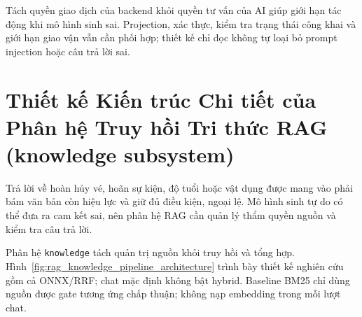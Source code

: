 Tách quyền giao dịch của backend khỏi quyền tư vấn của AI giúp giới hạn tác động khi mô hình sinh sai. Projection, xác thực, kiểm tra trạng thái công khai và giới hạn giao vận vẫn cần phối hợp; thiết kế chỉ đọc không tự loại bỏ prompt injection hoặc câu trả lời sai.

\section{Thiết kế Kiến trúc Chi tiết của Phân hệ Truy hồi Tri thức RAG (knowledge subsystem)}
\label{sec:rag_subsystem_design}

Trả lời về hoàn hủy vé, hoãn sự kiện, độ tuổi hoặc vật dụng được mang vào phải bám văn bản còn hiệu lực và giữ đủ điều kiện, ngoại lệ. Mô hình sinh tự do có thể đưa ra cam kết sai, nên phân hệ RAG cần quản lý thẩm quyền nguồn và kiểm tra câu trả lời.

Phân hệ \texttt{knowledge} tách quản trị nguồn khỏi truy hồi và tổng hợp. Hình~\ref{fig:rag_knowledge_pipeline_architecture} trình bày thiết kế nghiên cứu gồm cả ONNX/RRF; chat mặc định không bật hybrid. Baseline BM25 chỉ dùng nguồn được gate tương ứng chấp thuận; không nạp embedding trong mỗi lượt chat.

